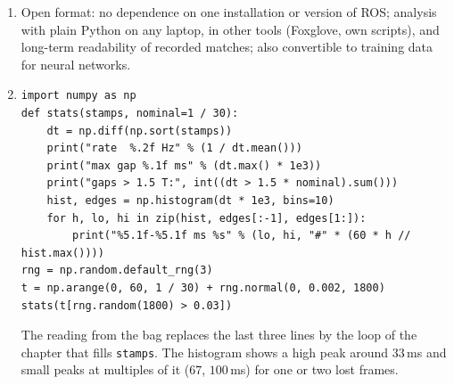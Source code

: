 \begin{enumerate}[label=\textbf{\ansnum.\arabic*}]
  \item Open format: no dependence on one installation or version of ROS; analysis with plain Python on any laptop, in other tools (Foxglove, own scripts), and long-term readability of recorded matches; also convertible to training data for neural networks.
  \item[\textbf{\ansnum.10}]
\begin{verbatim}
import numpy as np
def stats(stamps, nominal=1 / 30):
    dt = np.diff(np.sort(stamps))
    print("rate  %.2f Hz" % (1 / dt.mean()))
    print("max gap %.1f ms" % (dt.max() * 1e3))
    print("gaps > 1.5 T:", int((dt > 1.5 * nominal).sum()))
    hist, edges = np.histogram(dt * 1e3, bins=10)
    for h, lo, hi in zip(hist, edges[:-1], edges[1:]):
        print("%5.1f-%5.1f ms %s" % (lo, hi, "#" * (60 * h // hist.max())))
rng = np.random.default_rng(3)
t = np.arange(0, 60, 1 / 30) + rng.normal(0, 0.002, 1800)
stats(t[rng.random(1800) > 0.03])
\end{verbatim}
  The reading from the bag replaces the last three lines by the loop of the chapter that fills \verb!stamps!. The histogram shows a high peak around $33$\,ms and small peaks at multiples of it ($67$, $100$\,ms) for one or two lost frames.
\end{enumerate}
